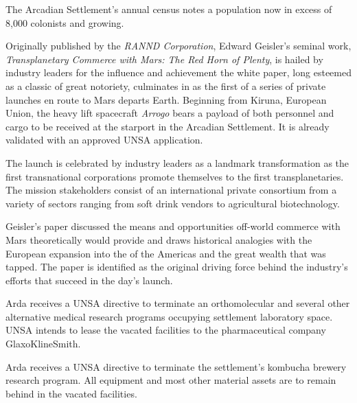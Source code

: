 

The Arcadian Settlement's annual census notes a population now in excess of 8,000 colonists and growing.
\StopTimelineDate

Originally published by the {\it RANND Corporation}, Edward Geisler's seminal work, {\it Transplanetary Commerce with Mars: The Red Horn of Plenty}, is hailed by industry leaders for the influence and achievement the white paper, long esteemed as a classic of great notoriety, culminates in as the first of a series of private launches en route to Mars departs Earth. Beginning from Kiruna, European Union, the heavy lift spacecraft {\it Arrogo} bears a payload of both personnel and cargo to be received at the starport in the Arcadian Settlement. It is already validated with an approved UNSA application.

The launch is celebrated by industry leaders as a landmark transformation as the first transnational corporations promote themselves to the first transplanetaries. The mission stakeholders consist of an international private consortium from a variety of sectors ranging from soft drink vendors to agricultural biotechnology.

Geisler's paper discussed the means and opportunities off-world commerce with Mars theoretically would provide and draws historical analogies with the European expansion into the  of the Americas and the great wealth that was tapped. The paper is identified as the original driving force behind the industry's efforts that succeed in the day's launch.
\StopTimelineDate

Arda receives a UNSA directive to terminate an orthomolecular and several other alternative medical research programs occupying settlement laboratory space. UNSA intends to lease the vacated facilities to the pharmaceutical company GlaxoKlineSmith.
\StopTimelineDate

Arda receives a UNSA directive to terminate the settlement's kombucha brewery research program. All equipment and most other material assets are to remain behind in the vacated facilities. 

